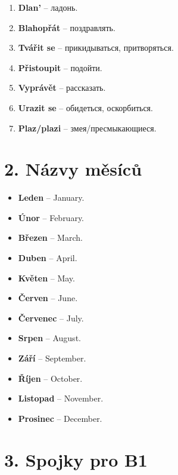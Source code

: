 \documentclass[12pt]{book}
\newcommand{\words}[2]{
    \renewcommand\chaptername{}
    \renewcommand\thechapter{}
    \chapter{#1. #2}
    \renewcommand\thechapter{#1}
}
\begin{document}
\begin{enumerate}
    \item \textbf{Dlan'} -- \textrussian{ладонь}.
    \item \textbf{Blahopřát} -- \textrussian{поздравлять}.
    \item \textbf{Tvářit se} -- \textrussian{прикидываться, притворяться}.
    \item \textbf{Přistoupit} -- \textrussian{подойти}.
    \item \textbf{Vyprávět} -- \textrussian{рассказать}.
    \item \textbf{Urazit se} -- \textrussian{обидеться, оскорбиться}.
    \item \textbf{Plaz/plazi} -- \textrussian{змея/пресмыкающиеся}.
\end{enumerate}

\words{2}{Názvy měsíců}
\begin{itemize}
    \item \textbf{Leden} -- January.
    \item \textbf{Únor} -- February.
    \item \textbf{Březen} -- March.
    \item \textbf{Duben} -- April.
    \item \textbf{Květen} -- May.
    \item \textbf{Červen} -- June.
    \item \textbf{Červenec} -- July.
    \item \textbf{Srpen} -- August.
    \item \textbf{Září} -- September.
    \item \textbf{Říjen} -- October.
    \item \textbf{Listopad} -- November.
    \item \textbf{Prosinec} -- December.
\end{itemize}

\words{3}{Spojky pro B1}
\end{document}
